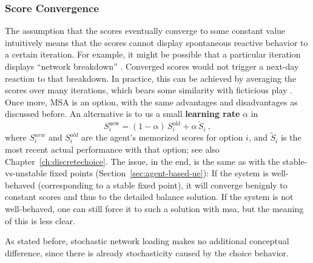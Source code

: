 \subsubsection{Score Convergence}
\label{sec:score-convergence}

The assumption that the scores
eventually converge to
some constant value intuitively means that the scores cannot display
spontaneous reactive behavior to a certain iteration.  For example, it
might be possible that a particular iteration displays ``network
breakdown'' \citep{RieserNagel2008NetworkBreakdown}.  Converged scores
would not trigger a next-day reaction to that breakdown.  In practice,
this can be achieved by averaging the scores over many iterations,
which bears some similarity with ficticious play 
\citep{monderer-1996, garcia-2000}.
Once more, MSA is an option, with the same advantages and
disadvantages as discussed before.  An alternative is to us a small
\textbf{learning rate} $\alpha$ in
\begin{equation}
S_i^\text{new} = (1-\alpha) \, S_i^\text{old} + \alpha \, \tilde S_i \ ,
\end{equation}
where $S_i^{new}$ and $S_i^{old}$ are the agent's memorized scores for
option $i$, and $\tilde S_i$ is the most recent actual performance
with that option; see also Chapter~\ref{ch:discretechoice}.  
The issue, in the end, is the same as with the
stable-vs-unstable fixed points (\cf Section~\ref{sec:agent-based-ue}):
If the system is well-behaved (corresponding to a stable fixed point),
it will converge benignly to constant scores and thus to the detailed
balance solution.  If the system is not well-behaved, one can still
force it to such a solution with \gls{msa}, but the meaning of this is less
clear.

As stated before, stochastic network loading makes no additional
conceptual difference, since there is already stochasticity caused by
the choice behavior.


